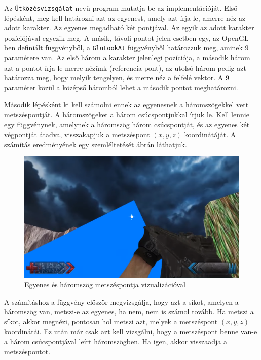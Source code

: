
Az \texttt{Ütközésvizsgálat} nevű program mutatja be az implementációját. Első lépésként, meg kell határozni azt az egyenest, amely azt írja le, amerre néz az adott karakter. Az egyenes megadható két pontjával. Az egyik az adott karakter pozíciójával egyezik meg. A másik, távoli pontot jelen esetben egy, az OpenGL-ben definiált függvényből, a \texttt{GluLookAt} függvényből határozzuk meg, aminek 9 paramétere van. Az első három a karakter jelenlegi pozíciója, a második három azt a pontot írja le merre nézünk (referencia pont), az utolsó három pedig azt határozza meg, hogy melyik tengelyen, és merre néz a felfelé vektor. A 9 paraméter közül a középső háromból lehet a második pontot  meghatározni.

Második lépésként ki kell számolni ennek az egyenesnek a háromszögekkel vett metszéspontját. A háromszögeket a három csúcspontjukkal írjuk le. Kell lennie egy függvénynek, amelynek a háromszög három csúcspontját, és az egyenes két végpontját átadva, visszakapjuk a metszéspont $(x, y, z)$ koordinátáját. A számítás eredményének egy szemléltetését  ábrán láthatjuk.

\begin{figure}[htb]
\centering
\includegraphics[scale=0.5]{kepek/one_triangle.png}
\caption{Egyenes és háromszög metszéspontja vizualizációval}
\label{fig:triangle}
\end{figure}

A számításhoz a függvény először megvizsgálja, hogy azt a síkot, amelyen a háromszög van, metszi-e az egyenes, ha nem, nem is számol tovább. Ha metszi a síkot, akkor megnézi, pontosan hol metszi azt, melyek a metszéspont $(x, y, z)$ koordinátái. Ez után már csak azt kell vizsgálni, hogy a metszéspont benne van-e a három csúcspontjával leírt háromszögben. Ha igen, akkor visszaadja a metszéspontot.

